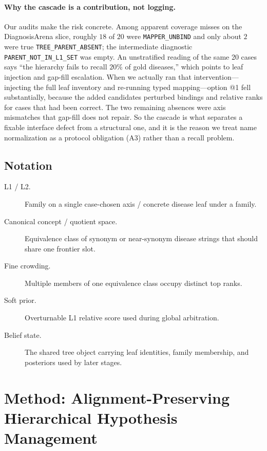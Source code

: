 \paragraph{Why the cascade is a contribution, not logging.}
Our audits make the risk concrete.
Among apparent coverage misses on the DiagnosisArena slice, roughly $18$ of $20$ were \texttt{MAPPER\_UNBIND} and only about $2$ were true \texttt{TREE\_PARENT\_ABSENT}; the intermediate diagnostic \texttt{PARENT\_NOT\_IN\_L1\_SET} was empty.
An unstratified reading of the same 20 cases says ``the hierarchy fails to recall $20\%$ of gold diseases,'' which points to leaf injection and gap-fill escalation.
When we actually ran that intervention---injecting the full leaf inventory and re-running typed mapping---option @1 fell substantially, because the added candidates perturbed bindings and relative ranks for cases that had been correct.
The two remaining absences were axis mismatches that gap-fill does not repair.
So the cascade is what separates a fixable interface defect from a structural one, and it is the reason we treat name normalization as a protocol obligation (A3) rather than a recall problem.

\subsection{Notation}
\label{sec:notation}

\begin{description}
  \item[L1 / L2.] Family on a single case-chosen axis / concrete disease leaf under a family.
  \item[Canonical concept / quotient space.] Equivalence class of synonym or near-synonym disease strings that should share one frontier slot.
  \item[Fine crowding.] Multiple members of one equivalence class occupy distinct top ranks.
  \item[Soft prior.] Overturnable L1 relative score used during global arbitration.
  \item[Belief state.] The shared tree object carrying leaf identities, family membership, and posteriors used by later stages.
\end{description}

\section{Method: Alignment-Preserving Hierarchical Hypothesis Management}
\label{sec:method}

